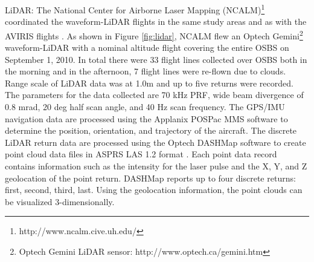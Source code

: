 \documentclass[remotesensing,article,accept,moreauthors,pdftex,12pt,a4paper]{mdpi}
\begin{document}
LiDAR: The National Center for Airborne Laser Mapping (NCALM)\footnote{http://www.ncalm.cive.uh.edu/} coordinated the waveform-LiDAR flights in the same study areas and as  with the AVIRIS flights \cite{neon2010aopdatarelease}. As shown in Figure \ref{fig:lidar}, NCALM flew an Optech Gemini\footnote{Optech Gemini LiDAR sensor: http://www.optech.ca/gemini.htm} waveform-LiDAR with a nominal altitude flight covering the entire OSBS on September 1, 2010. In total there were 33 flight lines collected over OSBS both in the morning and in the afternoon, 7 flight lines were re-flown due to clouds. Range scale of LiDAR data was at 1.0m and up to five returns were recorded. The parameters for the data collected are 70 kHz PRF, wide beam divergence of 0.8 mrad, 20 deg half scan angle, and 40 Hz scan frequency. The GPS/IMU navigation data are processed using the Applanix POSPac MMS software to determine the position, orientation, and trajectory of the aircraft. The discrete LiDAR return data are processed using the Optech DASHMap software to create point cloud data files in ASPRS LAS 1.2 format \cite{las12format}. Each point data record contains information such as the intensity for the laser pulse and the X, Y, and Z geolocation of the point return. DASHMap reports up to four discrete returns: first, second, third, last. Using the geolocation information, the point clouds can be visualized 3-dimensionally.
\end{document}
